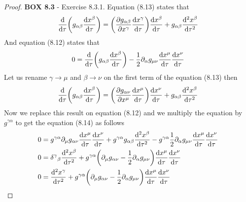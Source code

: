 \documentclass[11pt]{article}
\theoremstyle{definition}
\begin{document}
\begin{proof}{\textbf{BOX 8.3} - Exercise 8.3.1.}
    Equation (8.13) states that
    \begin{align*}
        \derivative{}{\tau}\bigg(g_{\alpha\beta}\derivative{x^\beta}{\tau}\bigg)
        = \bigg(\partialderivative{g_{\alpha\beta}}{x^\gamma}
        \derivative{x^\gamma}{\tau}\bigg)\derivative{x^\beta}{\tau}
        + g_{\alpha\beta}\derivative[2]{x^\beta}{\tau}
    \end{align*}
    And equation (8.12) states that
    \begin{align*}
        0 = \derivative{}{\tau}\bigg(
        g_{\alpha\beta}\derivative{x^\beta}{\tau}\bigg)
        - \frac{1}{2}\partial_\alpha g_{\mu\nu}\derivative{x^\mu}{\tau}
        \derivative{x^\nu}{\tau}
    \end{align*}
    Let us rename $\gamma \to \mu$ and $\beta \to \nu$ on the first term
    of the equation (8.13) then
    \begin{align*}
        \derivative{}{\tau}\bigg(g_{\alpha\beta}\derivative{x^\beta}{\tau}\bigg)
        = \bigg(\partialderivative{g_{\alpha\nu}}{x^\mu}
        \derivative{x^\mu}{\tau}\bigg)\derivative{x^\nu}{\tau}
        + g_{\alpha\beta}\derivative[2]{x^\beta}{\tau}
    \end{align*}
    Now we replace this result on equation (8.12) and we multiply the equation 
    by $g^{\gamma\alpha}$ to get the equation (8.14) as follows
    \begin{align*}
        0 &= g^{\gamma\alpha}\partial_\mu g_{\alpha\nu}
        \derivative{x^\mu}{\tau}\derivative{x^\nu}{\tau}
        + g^{\gamma\alpha}g_{\alpha\beta}\derivative[2]{x^\beta}{\tau}
        - g^{\gamma\alpha}\frac{1}{2}\partial_\alpha
        g_{\mu\nu}\derivative{x^\mu}{\tau}\derivative{x^\nu}{\tau}\\
        0 &= {\delta^\gamma}_\beta\derivative[2]{x^\beta}{\tau}
        + g^{\gamma\alpha}\bigg(\partial_\mu{g_{\alpha\nu}}
        - \frac{1}{2}\partial_\alpha g_{\mu\nu}\bigg)
        \derivative{x^\mu}{\tau}\derivative{x^\nu}{\tau}\\
        0 &= \derivative[2]{x^\gamma}{\tau}
        + g^{\gamma\alpha}\bigg(\partial_\mu{g_{\alpha\nu}}
        - \frac{1}{2}\partial_\alpha g_{\mu\nu}\bigg)
        \derivative{x^\mu}{\tau}\derivative{x^\nu}{\tau}
    \end{align*}
\end{proof}
\end{document}
